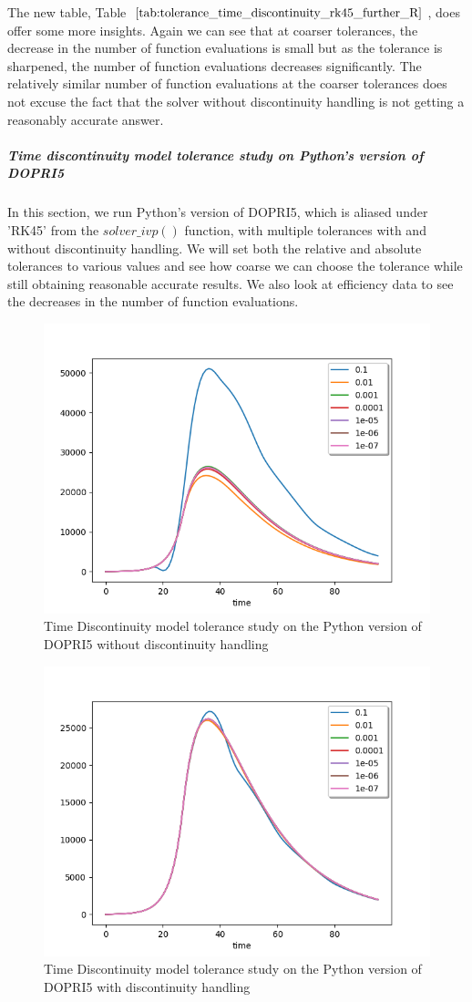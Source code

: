 The new table, Table $\ref{tab:tolerance_time_discontinuity_rk45_further_R}$, does offer some more insights. Again we can see that at coarser tolerances, the decrease in the number of function evaluations is small but as the tolerance is sharpened, the number of function evaluations decreases significantly. The relatively similar number of function evaluations at the coarser tolerances does not excuse the fact that the solver without discontinuity handling is not getting a reasonably accurate answer. 

\subparagraph{Time discontinuity model tolerance study on Python's version of DOPRI5}
In this section, we run Python's version of DOPRI5, which is aliased under 'RK45' from the $solver\_ivp()$ function, with multiple tolerances with and without discontinuity handling. We will set both the relative and absolute tolerances to various values and see how coarse we can choose the tolerance while still obtaining reasonable accurate results. We also look at efficiency data to see the decreases in the number of function evaluations.

\begin{figure}[H]
\centering
\includegraphics[width=0.7\linewidth]{./figures/tolerance_time_rk45_no_event_py}
\caption{Time Discontinuity model tolerance study on the Python version of DOPRI5 without discontinuity handling}
\label{fig:tolerance_time_rk45_no_event_py}
\end{figure}

\begin{figure}[H]
\centering
\includegraphics[width=0.7\linewidth]{./figures/tolerance_time_rk45_with_event_py}
\caption{Time Discontinuity model tolerance study on the Python version of DOPRI5 with discontinuity handling}
\label{fig:tolerance_time_rk45_with_event_py}
\end{figure}

